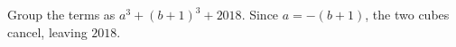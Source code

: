 Group the terms as $a^3+(b+1)^3+2018$. Since $a=-(b+1)$, the two cubes cancel, leaving $\boxed{2018}$.
